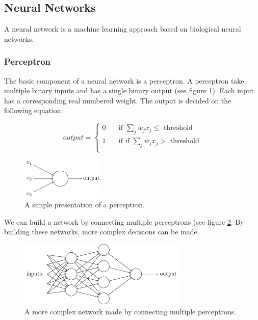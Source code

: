 	
	\subsection{Neural Networks}
	
A neural network is a machine learning approach based on biological neural networks. 


		\subsubsection{Perceptron}

The basic component of a neural network is a perceptron. A perceptron take multiple binary inputs and has a single binary output (see figure \ref{fig:perceptron}). Each input has a corresponding real numbered weight. The output is decided on the following equation:

\begin{equation} 
output =
  \begin{cases}
    0       	& \quad \text{if } \sum_j w_jx_j \leq \text{ threshold}\\
    1  		& \quad \text{if } \text{if } \sum_j w_jx_j > \text{ threshold}\\
  \end{cases}
\end{equation}
	
\begin{figure}[H]
	\centering
	\includegraphics[width=4cm]{perceptron.png}
	\caption{A simple presentation of a perceptron.}
	\label{fig:perceptron}
\end{figure}

We can build a network by connecting multiple perceptrons (see figure \ref{fig:multiplePerceptrons}. By building these networks, more complex decisions can be made.

\begin{figure}[H]
	\centering
	\includegraphics[width=8cm]{multiplePerceptrons.png}
	\caption{A more complex network made by connecting multiple perceptrons.}
	\label{fig:multiplePerceptrons}
\end{figure}

